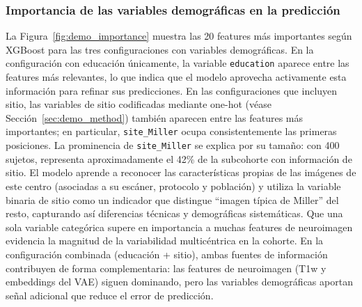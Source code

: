 \subsubsection{Importancia de las variables demográficas en la predicción}

La Figura~\ref{fig:demo_importance} muestra las 20 features más importantes según XGBoost para las tres configuraciones con variables demográficas. En la configuración con educación únicamente, la variable \texttt{education} aparece entre las features más relevantes, lo que indica que el modelo aprovecha activamente esta información para refinar sus predicciones. En las configuraciones que incluyen sitio, las variables de sitio codificadas mediante one-hot (véase Sección~\ref{sec:demo_method}) también aparecen entre las features más importantes; en particular, \texttt{site\_Miller} ocupa consistentemente las primeras posiciones. La prominencia de \texttt{site\_Miller} se explica por su tamaño: con 400 sujetos, representa aproximadamente el 42\% de la subcohorte con información de sitio. El modelo aprende a reconocer las características propias de las imágenes de este centro (asociadas a su escáner, protocolo y población) y utiliza la variable binaria de sitio como un indicador que distingue ``imagen típica de Miller'' del resto, capturando así diferencias técnicas y demográficas sistemáticas. Que una sola variable categórica supere en importancia a muchas features de neuroimagen evidencia la magnitud de la variabilidad multicéntrica en la cohorte. En la configuración combinada (educación + sitio), ambas fuentes de información contribuyen de forma complementaria: las features de neuroimagen (T1w y embeddings del VAE) siguen dominando, pero las variables demográficas aportan señal adicional que reduce el error de predicción.

